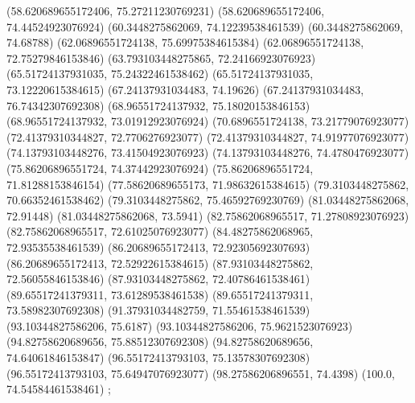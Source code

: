{{{		(58.620689655172406, 75.27211230769231)
		(58.620689655172406, 74.44524923076924)
		(60.3448275862069, 74.12239538461539)
		(60.3448275862069, 74.68788)
		(62.06896551724138, 75.69975384615384)
		(62.06896551724138, 72.75279846153846)
		(63.793103448275865, 72.24166923076923)
		(65.51724137931035, 75.24322461538462)
		(65.51724137931035, 73.12220615384615)
		(67.24137931034483, 74.19626)
		(67.24137931034483, 76.74342307692308)
		(68.96551724137932, 75.18020153846153)
		(68.96551724137932, 73.01912923076924)
		(70.6896551724138, 73.21779076923077)
		(72.41379310344827, 72.7706276923077)
		(72.41379310344827, 74.91977076923077)
		(74.13793103448276, 73.41504923076923)
		(74.13793103448276, 74.4780476923077)
		(75.86206896551724, 74.37442923076924)
		(75.86206896551724, 71.81288153846154)
		(77.58620689655173, 71.98632615384615)
		(79.3103448275862, 70.66352461538462)
		(79.3103448275862, 75.46592769230769)
		(81.03448275862068, 72.91448)
		(81.03448275862068, 73.5941)
		(82.75862068965517, 71.27808923076923)
		(82.75862068965517, 72.61025076923077)
		(84.48275862068965, 72.93535538461539)
		(86.20689655172413, 72.92305692307693)
		(86.20689655172413, 72.52922615384615)
		(87.93103448275862, 72.56055846153846)
		(87.93103448275862, 72.40786461538461)
		(89.65517241379311, 73.61289538461538)
		(89.65517241379311, 73.58982307692308)
		(91.37931034482759, 71.55461538461539)
		(93.10344827586206, 75.6187)
		(93.10344827586206, 75.9621523076923)
		(94.82758620689656, 75.88512307692308)
		(94.82758620689656, 74.64061846153847)
		(96.55172413793103, 75.13578307692308)
		(96.55172413793103, 75.64947076923077)
		(98.27586206896551, 74.4398)
		(100.0, 74.54584461538461)
	};

}}
